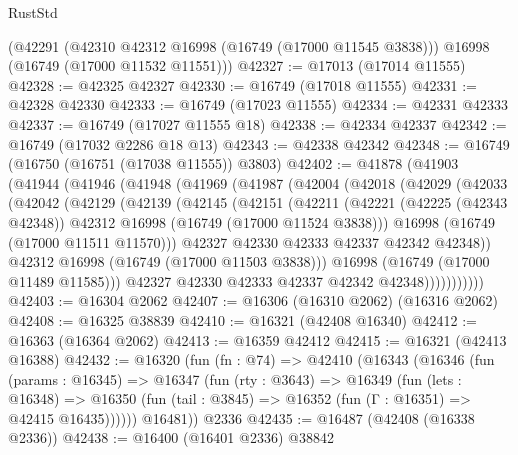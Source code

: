 \begin{lexlean}{RustStd}
\begin{coremodule}
    (@42291
      (@42310 @42312 @16998 (@16749 (@17000 @11545 @3838)))
      @16998
      (@16749 (@17000 @11532 @11551)))
@42327 := @17013 (@17014 @11555)
@42328 := @42325 @42327
@42330 := @16749 (@17018 @11555)
@42331 := @42328 @42330
@42333 := @16749 (@17023 @11555)
@42334 := @42331 @42333
@42337 := @16749 (@17027 @11555 @18)
@42338 := @42334 @42337
@42342 := @16749 (@17032 @2286 @18 @13)
@42343 := @42338 @42342
@42348 := @16749 (@16750 (@16751 (@17038 @11555)) @3803)
@42402 := @41878
    (@41903
      (@41944
        (@41946
          (@41948
            (@41969
              (@41987
                (@42004
                  (@42018
                    (@42029
                      (@42033
                        (@42042
                          (@42129
                            (@42139
                              (@42145
                                (@42151
                                  (@42211
                                    (@42221
                                      (@42225 (@42343 @42348))
                                      @42312
                                      @16998
                                      (@16749 (@17000 @11524 @3838)))
                                    @16998
                                    (@16749 (@17000 @11511 @11570)))
                                  @42327
                                  @42330
                                  @42333
                                  @42337
                                  @42342
                                  @42348))
                              @42312
                              @16998
                              (@16749 (@17000 @11503 @3838)))
                            @16998
                            (@16749 (@17000 @11489 @11585)))
                          @42327
                          @42330
                          @42333
                          @42337
                          @42342
                          @42348)))))))))))
@42403 := @16304 @2062
@42407 := @16306 (@16310 @2062) (@16316 @2062)
@42408 := @16325 @38839
@42410 := @16321 (@42408 @16340)
@42412 := @16363 (@16364 @2062)
@42413 := @16359 @42412
@42415 := @16321 (@42413 @16388)
@42432 := @16320
    (fun (fn : @74) =>
    @42410
      (@16343
        (@16346
          (fun (params : @16345) =>
          @16347
            (fun (rty : @3643) =>
            @16349
              (fun (lets : @16348) =>
              @16350 (fun (tail : @3845) => @16352 (fun (Γ : @16351) => @42415 @16435))))))
        @16481))
    @2336
@42435 := @16487 (@42408 (@16338 @2336))
@42438 := @16400 (@16401 @2336) @38842

\end{coremodule}
\end{lexlean}
